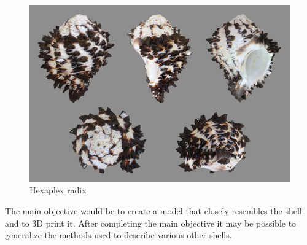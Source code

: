 \documentclass[a4paper]{article}
\begin{document}
\begin{figure}[h]
	\centering\includegraphics[scale=0.25]{./img/hexaplex_radix.jpg}
	\caption{Hexaplex radix \cite{wikipedia-hexaplex}}
	\label{fig:hexaplex-radix} %
\end{figure}

The main objective would be to create a model that closely resembles the shell and to 3D print it. After completing the main objective it may be possible to generalize the methods used to describe various other shells.



\end{document}
